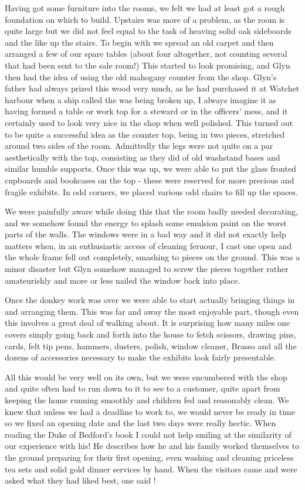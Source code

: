 Having got some furniture into the rooms, we felt we had at least got a rough foundation on which to build. Upstairs was more of a problem, as the room is quite large but we did not feel equal to the task of heaving solid oak sideboards and the like up the stairs. To begin with we spread an old carpet and then arranged a few of our spare tables (about four altogether, not counting several that had been sent to the sale room!) This started to look promising, and Glyn then had the idea of using the old mahogany counter from the shop. Glyn's father had always prized this wood very much, as he had purchased it at Watchet harbour when a ship called the  was being broken up, I always imagine it as having formed a table or work top for a steward or in the officers' mess, and it certainly used to look very nice in the shop when well polished. This turned out to be quite a successful idea as the counter top, being in two pieces, stretched around two sides of the room. Admittedly the legs were not quite on a par aesthetically with the top, consisting as they did of old washstand bases and similar humble supports. Once this was up, we were able to put the glass fronted cupboards and bookcases on the top - these were reserved for more precious and fragile exhibits. In odd corners, we placed various odd chairs to fill up the spaces.

We were painfully aware while doing this that the room badly needed decorating, and we somehow found the energy to splash some emulsion paint on the worst parts of the walls. The windows were in a bad way and it did not exactly help matters when, in an enthusiastic access of cleaning feruour, I cast one open and the whole frame fell out completely, smashing to pieces on the ground. This was a minor disaster but Glyn somehow managed to screw the pieces together rather amateurishly and more or less nailed the window back into place.

Once the donkey work was over we were able to start actually bringing things in and arranging them. This was far and away the most enjoyable part, though even this involves a great deal of walking about. It is surprising how many miles one covers simply going back and forth into the house to fetch scissors, drawing pins, cards, felt tip pens, hammers, dusters, polish, window cleaner, Brasso and all the dozens of accessories necessary to make the exhibits look fairly presentable.

All this would be very well on its own, but we were encumbered with the shop and quite often had to run down to it to see to a customer, quite apart from keeping the home running smoothly and children fed and reasonably clean. We knew that unless we had a deadline to work to, we would never be ready in time so we fixed an opening date and the last two days were really hectic. When reading the Duke of Bedford's book  I could not help smiling at the similarity of our experience with his! He describes how he and his family worked themselves to the ground preparing for their first opening, even washing and cleaning priceless tea sets and solid gold dinner services by hand. When the visitors came and were asked what they had liked best, one said !

